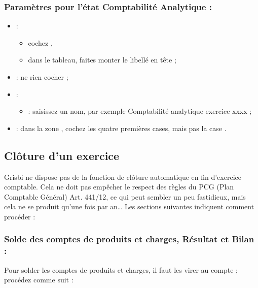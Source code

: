		
\subsubsection {Paramètres pour l'état Comptabilité Analytique :}
		
\begin{itemize}			
	\item {} :
		\begin{itemize}
			\item cochez ,				
			\item dans le tableau, faites monter le libellé  en tête ;
		\end{itemize}					
	\item {} : ne rien cocher ;			
	\item {} :
		\begin{itemize}
			\item {} : saisissez un nom, par exemple \og Comptabilité analytique exercice xxxx \fg{} ;
		\end{itemize}									 
	\item {} : dans la zone , cochez les quatre premières cases, mais pas la case .			
\end{itemize}		
 
\ifIllustration
\newpage
\fi


\subsection {Clôture d'un exercice\label{association-plan-closingResult}}

Grisbi ne dispose pas de la fonction de clôture automatique en fin d'exercice comptable. Cela ne doit pas empêcher le respect des règles du PCG (Plan Comptable Général) Art. 441/12, ce qui peut sembler un peu fastidieux, mais cela ne se produit qu'une fois par an\ldots{} Les sections suivantes indiquent comment procéder :


\subsubsection {Solde des comptes de produits et charges, Résultat et Bilan :}

Pour solder les comptes de produits et charges, il faut les virer au compte  ; procédez comme suit :


